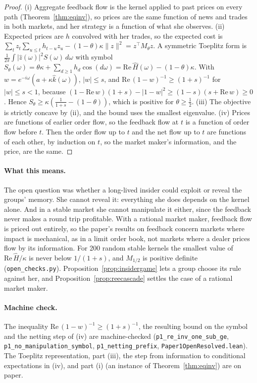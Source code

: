 \documentclass[12pt]{article}
\theoremstyle{definition}
\theoremstyle{remark}
\begin{document}
\begin{proof}
(i) Aggregate feedback flow is the kernel applied to past prices on every path (Theorem~\ref{thm:eqinv}), so prices are the same function of news and trades in both markets, and her strategy is a function of what she observes. (ii) Expected prices are $h$ convolved with her trades, so the expected cost is $\sum_tz_t\sum_{u\le t}h_{t-u}z_u-(1-\theta)\kappa\|z\|^2=z^\top M_\theta z$. A symmetric Toeplitz form is $\frac1{2\pi}\int|\hat z(\omega)|^2S(\omega)\,d\omega$ with symbol $S_\theta(\omega)=\theta\kappa+\sum_{d\ge1}h_d\cos(d\omega)=\mathrm{Re}\,\hat H(\omega)-(1-\theta)\kappa$. With $w=e^{-i\omega}(a+\kappa\hat k(\omega))$, $|w|\le s$, and $\mathrm{Re}\,(1-w)^{-1}\ge(1+s)^{-1}$ for $|w|\le s<1$, because $(1-\mathrm{Re}\,w)(1+s)-|1-w|^2\ge(1-s)(s+\mathrm{Re}\,w)\ge0$. Hence $S_\theta\ge\kappa(\frac1{1+s}-(1-\theta))$, which is positive for $\theta\ge\frac12$. (iii) The objective is strictly concave by (ii), and the bound uses the smallest eigenvalue. (iv) Prices are functions of earlier order flow, so the feedback flow at $t$ is a function of order flow before $t$. Then the order flow up to $t$ and the net flow up to $t$ are functions of each other, by induction on $t$, so the market maker's information, and the price, are the same.
\end{proof}

\paragraph{What this means.} The open question was whether a long-lived insider could exploit or reveal the groups' memory. She cannot reveal it: everything she does depends on the kernel alone. And in a stable market she cannot manipulate it either, since the feedback never makes a round trip profitable. With a rational market maker, feedback flow is priced out entirely, so the paper's results on feedback concern markets where impact is mechanical, as in a limit order book, not markets where a dealer prices flow by its information. For 200 random stable kernels the smallest value of $\mathrm{Re}\,\hat H/\kappa$ is never below $1/(1+s)$, and $M_{1/2}$ is positive definite (\nolinkurl{open_checks.py}). Proposition~\ref{prop:insidergame} lets a group choose its rule against her, and Proposition~\ref{prop:reecascade} settles the case of a rational market maker.

\paragraph{Machine check.} The inequality $\mathrm{Re}\,(1-w)^{-1}\ge(1+s)^{-1}$, the resulting bound on the symbol and the netting step of (iv) are machine-checked (\texttt{p1\_re\_inv\_one\_sub\_ge}, \texttt{p1\_no\_manipulation\_symbol}, \texttt{p1\_netting\_prefix}, \nolinkurl{Paper1OpenResolved.lean}). The Toeplitz representation, part (iii), the step from information to conditional expectations in (iv), and part (i) (an instance of Theorem~\ref{thm:eqinv}) are on paper.
\end{document}
